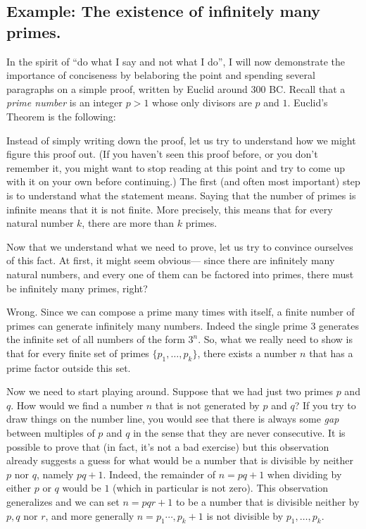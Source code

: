 \subsection{Example: The existence of infinitely many
primes.}\label{Example-The-existence-of-infin}

In the spirit of ``do what I say and not what I do'', I will now
demonstrate the importance of conciseness by belaboring the point and
spending several paragraphs on a simple proof, written by Euclid around
300 BC. Recall that a \emph{prime number} is an integer \(p>1\) whose
only divisors are \(p\) and \(1\). Euclid's Theorem is the following:

\hypertarget{infprimesthm}{}

Instead of simply writing down the proof, let us try to understand how
we might figure this proof out. (If you haven't seen this proof before,
or you don't remember it, you might want to stop reading at this point
and try to come up with it on your own before continuing.) The first
(and often most important) step is to understand what the statement
means. Saying that the number of primes is infinite means that it is not
finite. More precisely, this means that for every natural number \(k\),
there are more than \(k\) primes.

Now that we understand what we need to prove, let us try to convince
ourselves of this fact. At first, it might seem obvious--- since there
are infinitely many natural numbers, and every one of them can be
factored into primes, there must be infinitely many primes, right?

Wrong. Since we can compose a prime many times with itself, a finite
number of primes can generate infinitely many numbers. Indeed the single
prime \(3\) generates the infinite set of all numbers of the form
\(3^n\). So, what we really need to show is that for every finite set of
primes \(\{ p_1,\ldots,p_k\}\), there exists a number \(n\) that has a
prime factor outside this set.

Now we need to start playing around. Suppose that we had just two primes
\(p\) and \(q\). How would we find a number \(n\) that is not generated
by \(p\) and \(q\)? If you try to draw things on the number line, you
would see that there is always some \emph{gap} between multiples of
\(p\) and \(q\) in the sense that they are never consecutive. It is
possible to prove that (in fact, it's not a bad exercise) but this
observation already suggests a guess for what would be a number that is
divisible by neither \(p\) nor \(q\), namely \(pq+1\). Indeed, the
remainder of \(n=pq+1\) when dividing by either \(p\) or \(q\) would be
\(1\) (which in particular is not zero). This observation generalizes
and we can set \(n=pqr+1\) to be a number that is divisible neither by
\(p,q\) nor \(r\), and more generally \(n=p_1\cdots, p_k +1\) is not
divisible by \(p_1,\ldots,p_k\).

